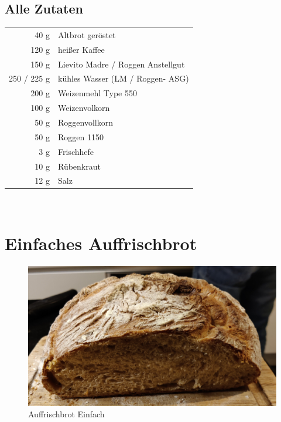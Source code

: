 \subsection*{Alle Zutaten}
\begin{tabular}{r l}
           40 g & Altbrot geröstet                  \\
          120 g & heißer Kaffee                     \\
          150 g & Lievito Madre / Roggen Anstellgut \\
    250 / 225 g & kühles Wasser (LM / Roggen- ASG)  \\
          200 g & Weizenmehl Type 550               \\
          100 g & Weizenvolkorn                     \\
           50 g & Roggenvollkorn                    \\
           50 g & Roggen 1150                       \\
            3 g & Frischhefe                        \\
           10 g & Rübenkraut                        \\
           12 g & Salz
\end{tabular}\\


\section{Einfaches Auffrischbrot}  
\begin{figure}[H]
    \centering
    \includegraphics[width=0.7\linewidth]{Bilder/AuffrischbrotEinfach}
    \caption{Auffrischbrot Einfach}
    \label{fig:auffrischbroteinfach}
\end{figure}

